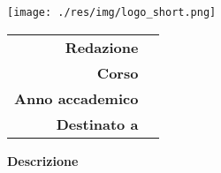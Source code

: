 \thispagestyle{empty}
\begin{titlepage}
	\begin{center}
		\vfill
        \large
		\texttt{[image: ./res/img/logo\_short.png]}
		\vfill
		\begin{Huge}
			\textbf{\docTitle}
		\end{Huge}
		\vfill
		\vspace*{\fill}
		\begin{tabular}{r|l}
			\textbf{Redazione} & \red \\
			\textbf{Corso} & \corso \\
			\textbf{Anno accademico} & \annoAcc \\
			\textbf{Destinato a} & \destinatari \\
		\end{tabular}	
		\normalsize
		\vfill
		\textbf{Descrizione}\\
		\textit{\desc} \\
		\vfill
	\end{center}
\end{titlepage}
